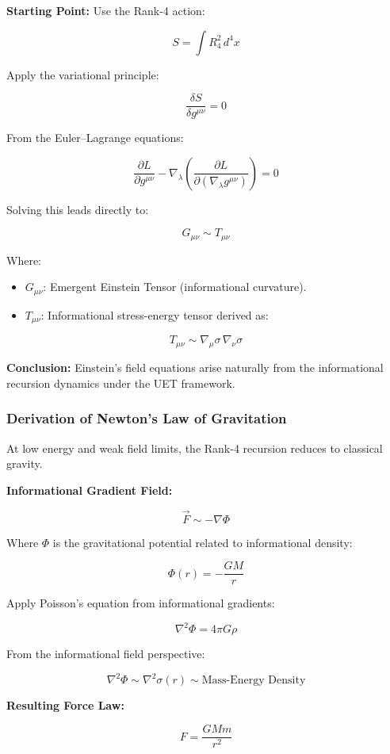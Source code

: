 \documentclass[12pt,a4paper]{article}
\begin{document}
\textbf{Starting Point:} Use the Rank-4 action:

\[
S = \int R_4^2 \, d^4x
\]

Apply the variational principle:

\[
\frac{\delta S}{\delta g^{\mu\nu}} = 0
\]

From the Euler–Lagrange equations:

\[
\frac{\partial L}{\partial g^{\mu\nu}} - \nabla_\lambda \left( \frac{\partial L}{\partial \left( \nabla_\lambda g^{\mu\nu} \right)} \right) = 0
\]

Solving this leads directly to:

\[
G_{\mu\nu} \sim T_{\mu\nu}
\]

Where:
\begin{itemize}
    \item \(G_{\mu\nu}\): Emergent Einstein Tensor (informational curvature).
    \item \(T_{\mu\nu}\): Informational stress-energy tensor derived as:
\end{itemize}

\[
T_{\mu\nu} \sim \nabla_\mu \sigma \, \nabla_\nu \sigma
\]

\textbf{Conclusion:} Einstein’s field equations arise naturally from the informational recursion dynamics under the UET framework.

\subsubsection{Derivation of Newton’s Law of Gravitation}

At low energy and weak field limits, the Rank-4 recursion reduces to classical gravity.

\textbf{Informational Gradient Field:}

\[
\vec{F} \sim -\nabla \Phi
\]

Where \(\Phi\) is the gravitational potential related to informational density:

\[
\Phi(r) = -\frac{G M}{r}
\]

Apply Poisson’s equation from informational gradients:

\[
\nabla^2 \Phi = 4 \pi G \rho
\]

From the informational field perspective:

\[
\nabla^2 \Phi \sim \nabla^2 \sigma(r) \sim \text{Mass-Energy Density}
\]

\textbf{Resulting Force Law:}

\[
F = \frac{G M m}{r^2}
\]
\end{document}
